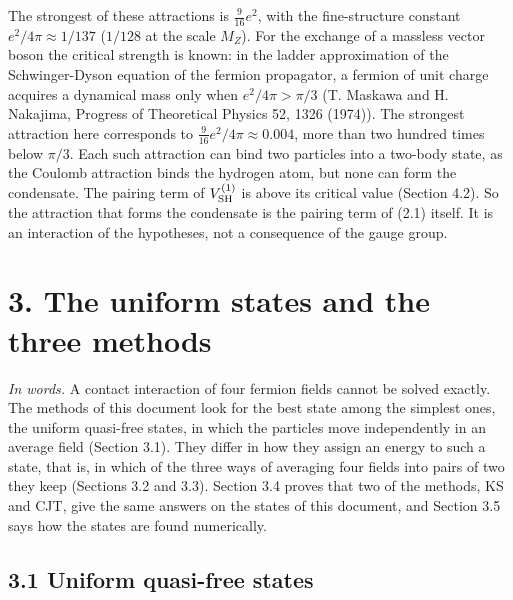 \documentclass[
  10pt,
]{article}
\begin{document}
The strongest of these attractions is \(\tfrac9{16}e^2\), with the
fine-structure constant \(e^2/4\pi\approx1/137\) (\(1/128\) at the scale
\(M_Z\)). For the exchange of a massless vector boson the critical
strength is known: in the ladder approximation of the Schwinger-Dyson
equation of the fermion propagator, a fermion of unit charge acquires a
dynamical mass only when \(e^2/4\pi>\pi/3\) (T. Maskawa and H. Nakajima,
Progress of Theoretical Physics 52, 1326 (1974)). The strongest
attraction here corresponds to \(\tfrac9{16}e^2/4\pi\approx0.004\), more
than two hundred times below \(\pi/3\). Each such attraction can bind
two particles into a two-body state, as the Coulomb attraction binds the
hydrogen atom, but none can form the condensate. The pairing term of
\(V^{(1)}_{\rm SH}\) is above its critical value (Section 4.2). So the
attraction that forms the condensate is the pairing term of (2.1)
itself. It is an interaction of the hypotheses, not a consequence of the
gauge group.

\hypertarget{the-uniform-states-and-the-three-methods}{%
\section{3. The uniform states and the three
methods}\label{the-uniform-states-and-the-three-methods}}

\emph{In words.} A contact interaction of four fermion fields cannot be
solved exactly. The methods of this document look for the best state
among the simplest ones, the uniform quasi-free states, in which the
particles move independently in an average field (Section 3.1). They
differ in how they assign an energy to such a state, that is, in which
of the three ways of averaging four fields into pairs of two they keep
(Sections 3.2 and 3.3). Section 3.4 proves that two of the methods, KS
and CJT, give the same answers on the states of this document, and
Section 3.5 says how the states are found numerically.

\hypertarget{uniform-quasi-free-states}{%
\subsection{3.1 Uniform quasi-free
states}\label{uniform-quasi-free-states}}
\end{document}

